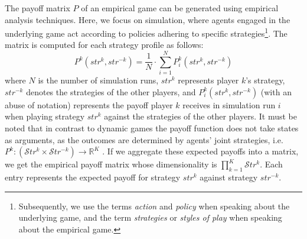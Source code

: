\begin{flushleft}
    The payoff matrix $P$ of an empirical game can be generated using empirical analysis techniques. Here, we focus on simulation, where agents engaged in the underlying game act according to policies adhering to specific strategies\footnote{Subsequently, we use the terms \emph{action} and \emph{policy} when speaking about the underlying game, and the term \emph{strategies} or \emph{styles of play} when speaking about the empirical game.}. The matrix is computed for each strategy profile as follows:
    \begin{equation}
        P^k(str^k, str^{-k}) =\frac{1}{N} \cdot \sum_{i=1}^{N} P^k_{i}(str^k, str^{-k})
        \label{eq:meta_payoff}
    \end{equation}
    where $N$ is the number of simulation runs, $str^k$ represents player $k$'s strategy, $str^{-k}$ denotes the strategies of the other players, and $P^k_{i}(str^k, str^{-k})$ (with an abuse of notation) represents the payoff player $k$ receives in simulation run $i$ when playing strategy $str^k$ against the strategies of the other players. It must be noted that in contrast to dynamic games the payoff function does not take states as arguments, as the outcomes are determined by agents' joint strategies, i.e. $P^k: (\mathcal{S}tr^k \times \mathcal{S}tr^{-k}) \to \mathbb{R}^K$ \cite{omidshafiei2019alpharank}. If we aggregate these expected payoffs into a matrix, we get the empirical payoff matrix whose dimensionality is $\prod_{k=1}^K\mathcal{S}tr^k$. Each entry represents the expected payoff for strategy $str^k$ against strategy $str^{-k}$.

\end{flushleft}